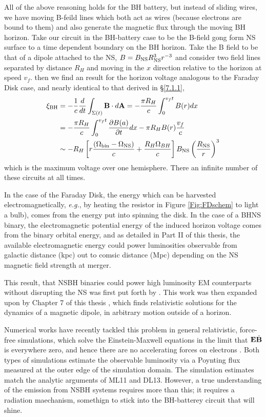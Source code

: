 All of the above reasoning holds for the BH battery, but instead of sliding
wires, we have moving B-feild lines which both act as wires (because electrons
are bound to them) and also generate the magnetic flux through the moving BH
horizon. Take our circuit in the BH-battery case to be the B-field gong form NS surface to a time dependent boundary on the BH horizon. Take the B field to be
that of a dipole attached to the NS, $B = B_{\rm NS} R^3_{\rm NS} r^{-3}$ and
consider two field lines separated by distance $R_H$ and moving in the $x$
direction relative to the horizon at speed $v_f$. then we find an result for
the horizon voltage analogous to the Faraday Disk case, and nearly identical
to that derived in \S \ref{7.1.1},
\begin{align}
\xi_{\rm BH} &= - \frac{1}{c}\frac{d}{dt} \int_{\Sigma(t)}{{\bf B} \cdot d{\bf A}} =  - \frac{\pi R_H}{c} \int^{v_f t}_{0} {B(r) dx}  \\
&=  - \frac{\pi R_H}{c}  \int^{v_f t}_{0}{ \frac{\partial B(a)}{\partial t} dx}  - \pi R_H B(r) \frac{v_f}{c}    \\
& \sim    -R_H \left[r \frac{\left(\Omega_{\rm bin}  - \Omega_{\rm NS}\right)}{c} + \frac{R_H\Omega_{BH}}{c}\right] B_{\rm NS}  \left( \frac{R_{\rm NS}}{r} \right)^3
\end{align}
which is the maximum voltage over one hemisphere. There an infinite number of these circuits at all times. 

In the case of the Faraday Disk, the energy which can be harvested
electromagnetically, \emph{e.g.}, by heating the resistor in Figure
\ref{Fig:FDschem} to light a bulb), comes from the energy put into spinning
the disk. In the case of a BHNS binary, the electromagnetic potential energy
of the induced horizon voltage comes from the binary orbital energy, and as
detailed in Part II of this thesis, the available electromagnetic energy could
power luminosities observable from galactic distance (kpc) out to comsic
distance (Mpc) depending on the NS magnetic field strength at merger.


This result, that NSBH binaries could power high luminosity EM counterparts
without disrupting the NS was first put forth by
\cite[ML11][]{McL:2011}. This work was then expanded upon by
Chapter 7 of this thesis \cite[DL13][]{DL:2013:PhRvD}, which finds relativistic
solutions for the dynamics of a magnetic dipole, in arbitrary motion outside
of a horizon. 

Numerical works have recently tackled this problem in general relativistic,
force-free simulations, which solve the Einstein-Maxwell equations in the
limit that ${\bf E} \dot {{\bf B}}$ is everywhere zero, and hence there are no
accelerating forces on electrons \citep{Paschalidis:2013}. Both types of
simulations estimate the observable luminosity via a Poynting flux measured at
the outer edge of the simulation domain. The simulation estimates match the
analytic arguments of ML11 and DL13. However, a true understanding of the
emission from NSBH systems requires more than this; it requires a radiation
maechanism, somethign to stick into the BH-batterey circuit that will shine.


